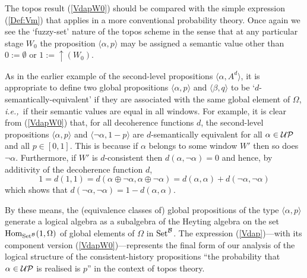 \documentclass[12pt]{article}
\newcounter{def-number}[section]
\newcommand{\beq}{\begin{equation}}
\newcommand{\eeq}{\end{equation}}
\newcommand{\eq}[1]{(\ref{#1})}
\newcommand{\ie}{{\em i.e.,\ }}
\renewcommand{\a}{\alpha}                   %
\renewcommand{\b}{\beta}                    %
\newcommand{\gp}[2]{\langle#1,#2\rangle}
\newcommand{\up}[1]{\uparrow\!\!(#1)}
\newcommand{\Hom}{\mbox{Hom}}
\newcommand{\Om}{\Omega}
\newcommand{\UP}{{\cal UP}}
\newcommand{\Set}{{\rm Set}}
\newcommand{\SetB}{{\Set^{\cal B}}}
\begin{document}
	The topos result \eq{VdapW0} should be compared with the
simple expression \eq{Def:Vm} that applies in a more conventional
probability theory. Once again we see the `fuzzy-set' nature of
the topos scheme in the sense that at any particular stage
$W_0$ the proposition $\gp{\a}{p}$ may be assigned a semantic value
other than $0:=\emptyset$ or $1:=\up{W_0}$.

	As in the earlier example of the second-level propositions
$\gp{\a}{A^d}$, it is appropriate to define two global propositions
$\gp{\a}{p}$ and $\gp{\b}{q}$ to be `$d$-semantically-equivalent' if
they are associated with the same global element of $\Om$, \ie if
their semantic values are equal in all windows. For example, it is
clear from \eq{VdapW0} that, for all decoherence functions $d$, the
second-level propositions $\gp{\a}{p}$ and $\gp{\neg\a}{1-p}$ are
$d$-semantically equivalent for all $\a\in\UP$ and all $p\in[0,1]$.
This is because if $\a$ belongs to some window $W'$ then so does
$\neg\a$. Furthermore, if $W'$ is $d$-consistent then
$d(\a,\neg\a)=0$ and hence, by additivity of the decoherence
function $d$,
\beq
	1=d(1,1)=d(\a\oplus\neg\a,\a\oplus\neg\a)=d(\a,\a)+d(\neg\a,\neg\a)  
\eeq
which shows that $d(\neg\a,\neg\a)=1-d(\a,\a)$.

	By these means, the (equivalence classes of) global
propositions of the type $\gp{\a}{p}$ generate a logical algebra
as a subalgebra of the Heyting algebra on the set
$\Hom_\SetB(1,\Om)$ of global elements of $\Om$ in $\SetB$. The
expression \eq{Vdap}---with its component version
\eq{VdapW0}---represents the final form of our analysis of the
logical structure of the consistent-history propositions ``the
probability that $\a\in\UP$ is realised is $p$'' in the context of
topos theory.
\end{document}
